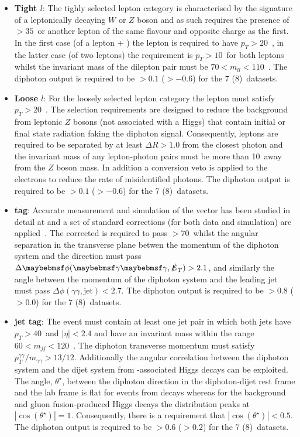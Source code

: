 \begin{itemize}
  \item \textbf{\VH Tight $l$}: The tighly selected lepton category is characterised by the signature of a leptonically decaying $W$ or $Z$ boson and as such requires the presence of \MET$>35$~\GeV or another lepton of the same flavour and opposite charge as the first. In the first case (of a lepton + \MET) the lepton is required to have $p_{T}>20$~\GeV, in the latter case (of two leptons) the requirement is $p_{T}>10$~\GeV for both leptons whilst the invariant mass of the dilepton pair must be $70 < m_{ll} < 110$~\GeV. The diphoton \BDT output is required to be $>0.1$ ($>-0.6$) for the 7 (8)~\TeV datasets.
  \item \textbf{\VH Loose $l$}: For the loosely selected lepton category the lepton \pT must satisfy $p_{T}>20$~\GeV. The selection requirements are designed to reduce the background from leptonic $Z$ bosons (not associated with a Higgs) that contain initial or final state radiation faking the diphoton signal. Consequently, leptons are required to be separated by at least $\Delta R>1.0$ from the closest photon and the invariant mass of any lepton-photon pairs must be more than 10~\GeV away from the $Z$ boson mass. In addition a conversion veto is applied to the electrons to reduce the rate of misidentified photons. The diphoton \BDT output is required to be $>0.1$ ($>-0.6$) for the 7 (8)~\TeV datasets.
  \item \textbf{\VH \MET tag}: Accurate measurement and simulation of the \MET vector has been studied in detail at \CMS and a set of standard corrections (for both data and simulation) are applied~\cite{met_corrs}. The corrected \MET is required to pass \MET$>70$~\GeV whilst the angular separation in the transverse plane betwen the momentum of the diphoton system and the \MET direction must pass $\Delta\phi(\gamma\gamma,\MET)>2.1$, and similarly the angle between the momentum of the diphoton system and the leading jet must pass $\Delta\phi(\gamma\gamma,\mbox{jet})<2.7$. The diphoton \BDT output is required to be $>0.8$ ($>0.0$) for the 7 (8)~\TeV datasets.   
  \item \textbf{\VH jet tag}: The event must contain at least one jet pair in which both jets have $p_{T}>40$~\GeV and $|\eta|<2.4$ and have an invariant mass within the range $60<m_{jj}<120$~\GeV. The diphoton transverse momentum must satisfy $p_{T}^{\gamma\gamma}/m_{\gamma\gamma}>13/12$. Additionally the angular correlation between the diphoton system and the dijet system from \VH-associated Higgs decays can be exploited. The angle, $\theta^{\star}$, between the diphoton direction in the diphoton-dijet rest frame and the lab frame is flat for events from \VH decays whereas for the background and gluon fusion-produced Higgs decays the distribution peaks at $|\cos(\theta^{\star})|=1$. Consequently, there is a requirement that $|\cos(\theta^{\star})|<0.5$. The diphoton \BDT output is required to be $>0.6$ ($>0.2$) for the 7 (8)~\TeV datasets. 
\end{itemize}

